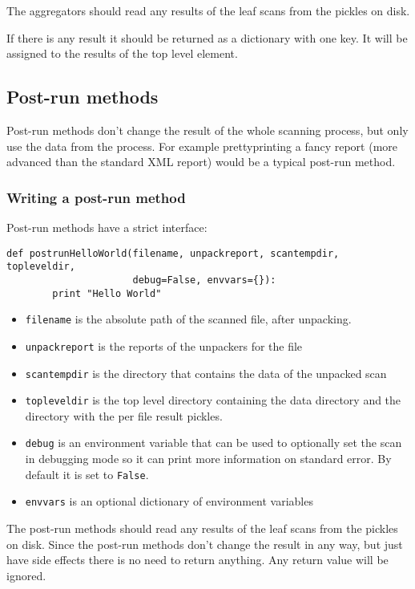 \documentclass[10pt]{article}
\begin{document}
The aggregators should read any results of the leaf scans from the pickles
on disk.

If there is any result it should be returned as a dictionary with one key. It
will be assigned to the results of the top level element.

\subsection{Post-run methods}

Post-run methods don't change the result of the whole scanning process, but
only use the data from the process. For example prettyprinting a fancy report
(more advanced than the standard XML report) would be a typical post-run
method.

\subsubsection{Writing a post-run method}

Post-run methods have a strict interface:

\begin{verbatim}
def postrunHelloWorld(filename, unpackreport, scantempdir, topleveldir,
                      debug=False, envvars={}):
        print "Hello World"
\end{verbatim}

\begin{itemize}
\item \texttt{filename} is the absolute path of the scanned file, after
unpacking.
\item \texttt{unpackreport} is the reports of the unpackers for the file
\item \texttt{scantempdir} is the directory that contains the data of the
unpacked scan
\item \texttt{topleveldir} is the top level directory containing the data
directory and the directory with the per file result pickles.
\item \texttt{debug} is an environment variable that can be used to optionally
set the scan in debugging mode so it can print more information on standard
error. By default it is set to \texttt{False}.
\item \texttt{envvars} is an optional dictionary of environment variables
\end{itemize}

The post-run methods should read any results of the leaf scans from the pickles
on disk. Since the post-run methods don't change the result in any way, but
just have side effects there is no need to return anything. Any return value
will be ignored.
\end{document}
